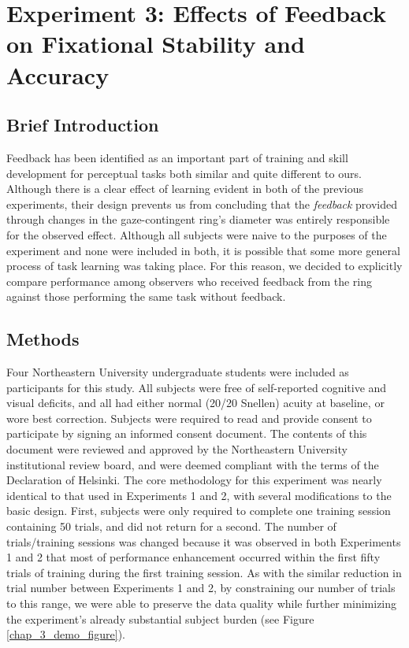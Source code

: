 \chapter{Experiment 3: Effects of Feedback on Fixational Stability and Accuracy}

\section{Brief Introduction}

Feedback has been identified as an important part of training and skill development for perceptual tasks both similar \citep{vingolo_2007, contestabile_2002} and quite different \citep{pusswald_2013} to ours. Although there is a clear effect of learning evident in both of the previous experiments, their design prevents us from concluding that the \textit{feedback} provided through changes in the gaze-contingent ring's diameter was entirely responsible for the observed effect. Although all subjects were naive to the purposes of the experiment and none were included in both, it is possible that some more general process of task learning was taking place. For this reason, we decided to explicitly compare performance among observers who received feedback from the ring against those performing the same task without feedback.

\section{Methods}

Four Northeastern University undergraduate students were included as participants for this study. All subjects were free of self-reported cognitive and visual deficits, and all had either normal (20/20 Snellen) acuity at baseline, or wore best correction. Subjects were required to read and provide consent to participate by signing an informed consent document. The contents of this document were reviewed and approved by the Northeastern University institutional review board, and were deemed compliant with the terms of the Declaration of Helsinki. The core methodology for this experiment was nearly identical to that used in Experiments 1 and 2, with several modifications to the basic design. First, subjects were only required to complete one training session containing 50 trials, and did not return for a second. The number of trials/training sessions was changed because it was observed in both Experiments 1 and 2 that most of performance enhancement occurred within the first fifty trials of training during the first training session. As with the similar reduction in trial number between Experiments 1 and 2, by constraining our number of trials to this range, we were able to preserve the data quality while further minimizing the experiment's already substantial subject burden (see Figure \ref{chap_3_demo_figure}).

